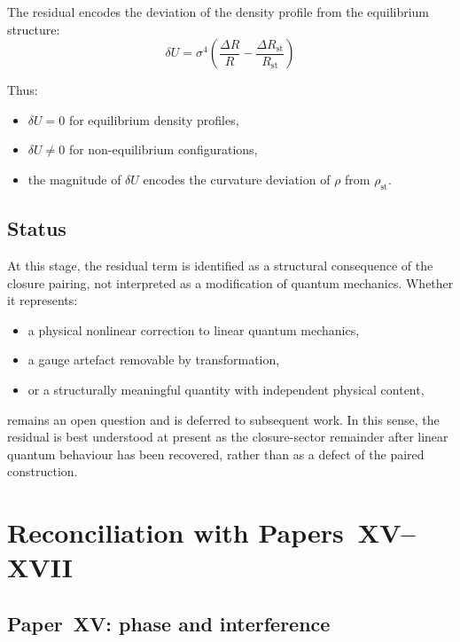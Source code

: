 \documentclass[12pt]{article}
\begin{document}
The residual encodes the deviation of the density profile from the equilibrium structure:
\begin{equation}
    \delta U = \sigma^4 \left(\frac{\Delta R}{R} - \frac{\Delta R_{\mathrm{st}}}{R_{\mathrm{st}}}\right)
\end{equation}

Thus:
\begin{itemize}
    \item $\delta U = 0$ for equilibrium density profiles,
    \item $\delta U \neq 0$ for non-equilibrium configurations,
    \item the magnitude of $\delta U$ encodes the curvature deviation of $\rho$ from $\rho_{\mathrm{st}}$.
\end{itemize}

\subsection*{Status}

At this stage, the residual term is identified as a structural consequence of the closure pairing, not interpreted as a modification of quantum mechanics. Whether it represents:
\begin{itemize}
    \item a physical nonlinear correction to linear quantum mechanics,
    \item a gauge artefact removable by transformation,
    \item or a structurally meaningful quantity with independent physical content,
\end{itemize}
remains an open question and is deferred to subsequent work. In this sense, the residual is best understood at present as the closure-sector remainder after linear quantum behaviour has been recovered, rather than as a defect of the paired construction.

\section{Reconciliation with Papers~XV--XVII}\label{sec:reconciliation}

\subsection{Paper~XV: phase and interference}
\end{document}
